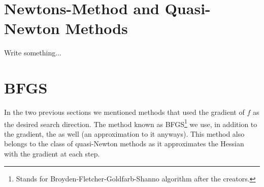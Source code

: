     
\section{Newtons-Method and Quasi-Newton
Methods\label{sec:newtons-method_and_quasi-newton_methods}}
    Write something...

\section{BFGS\label{sec:BFGS}}
    In the two previous sections we mentioned methods that used the gradient of
    $f$ as the desired search direction. The method known as
    BFGS\footnote{Stands for Broyden-Fletcher-Goldfarb-Shanno algorithm after
    the creators.} we use, in addition to the gradient, the  as well (an approximation to it anyways). This method also belongs
    to the class of quasi-Newton methods as it approximates the Hessian with
    the gradient at each step.
